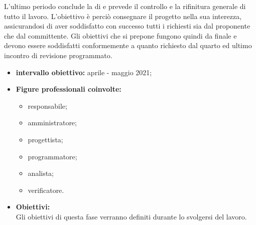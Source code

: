 L'ultimo periodo conclude la  di  e prevede il controllo e la rifinitura generale di tutto il lavoro. L'obiettivo è perciò consegnare il progetto nella sua interezza, assicurandosi di aver soddisfatto con successo tutti i  richiesti sia dal proponente che dal committente. Gli obiettivi che si prepone fungono quindi da  finale e devono essere soddisfatti conformemente a quanto richiesto dal quarto ed ultimo incontro di revisione programmato.
 \begin{itemize}
         \item \textbf{intervallo obiettivo: } aprile - maggio 2021;
         \item  \textbf{Figure professionali coinvolte:}
         \begin{itemize}
            \item responsabile;
            \item amministratore;
            \item progettista;
            \item programmatore;
            \item analista;
            \item verificatore.
        \end{itemize}
         \item \textbf{Obiettivi:}\\
         Gli obiettivi di questa fase verranno definiti durante lo svolgersi del lavoro. 
 \end{itemize}
